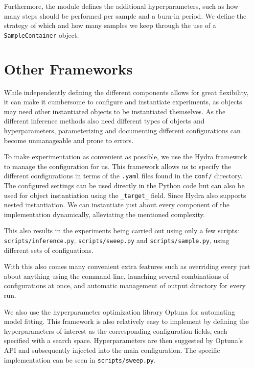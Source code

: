 Furthermore, the module defines the additional hyperparameters, such as how many steps should be performed per sample and a burn-in period.
We define the strategy of which and how many samples we keep through the use of a \texttt{SampleContainer} object.

\section{Other Frameworks}

While independently defining the different components allows for great flexibility, it can make it cumbersome to configure and instantiate experiments, as objects may need other instantiated objects to be instantiated themselves.
As the different inference methods also need different types of objects and hyperparameters, parameterizing and documenting different configurations can become unmanageable and prone to errors.

To make experimentation as convenient as possible, we use the Hydra \autocite{yadan_hydra_2019} framework to manage the configuration for us.  
This framework allows us to specify the different configurations in terms of the \texttt{.yaml} files found in the \texttt{conf/} directory.
The configured settings can be used directly in the Python code but can also be used for object instantiation using the \texttt{\_target\_} field.
Since Hydra also supports nested instantiation.
We can instantiate just about every component of the implementation dynamically, alleviating the mentioned complexity.

This also results in the experiments being carried out using only a few scripts: \texttt{scripts/inference.py}, \texttt{scripts/sweep.py} and \texttt{scripts/sample.py}, using different sets of configuations.

With this also comes many convenient extra features such as overriding every just about anything using the command line, launching several combinations of configurations at once, and automatic management of output directory for every run.

We also use the hyperparameter optimization library Optuna \autocite{akiba_optuna_2019} for automating model fitting.
This framework is also relatively easy to implement by defining the hyperparameters of interest as the corresponding configuration fields, each specified with a search space. 
Hyperparameters are then suggested by Optuna's API and subsequently injected into the main configuration. 
The specific implementation can be seen in \texttt{scripts/sweep.py}.
